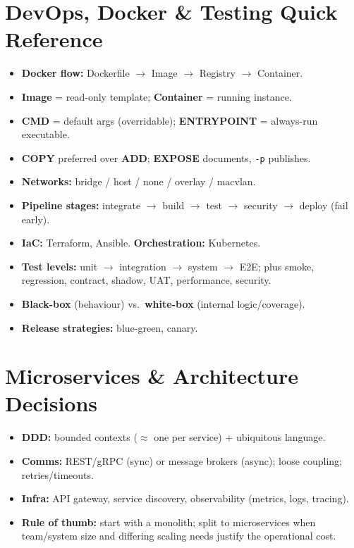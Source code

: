 \documentclass[hidelinks]{article}
\begin{document}
\section{DevOps, Docker \& Testing Quick Reference}
\begin{itemize}
  \item \textbf{Docker flow:} Dockerfile $\to$ Image $\to$ Registry $\to$ Container.
  \item \textbf{Image} = read-only template; \textbf{Container} = running instance.
  \item \textbf{CMD} = default args (overridable); \textbf{ENTRYPOINT} = always-run executable.
  \item \textbf{COPY} preferred over \textbf{ADD}; \textbf{EXPOSE} documents, \texttt{-p} publishes.
  \item \textbf{Networks:} bridge / host / none / overlay / macvlan.
  \item \textbf{Pipeline stages:} integrate $\to$ build $\to$ test $\to$ security $\to$ deploy
        (fail early).
  \item \textbf{IaC:} Terraform, Ansible. \textbf{Orchestration:} Kubernetes.
  \item \textbf{Test levels:} unit $\to$ integration $\to$ system $\to$ E2E; plus smoke, regression,
        contract, shadow, UAT, performance, security.
  \item \textbf{Black-box} (behaviour) vs.\ \textbf{white-box} (internal logic/coverage).
  \item \textbf{Release strategies:} blue-green, canary.
\end{itemize}

\section{Microservices \& Architecture Decisions}
\begin{itemize}
  \item \textbf{DDD:} bounded contexts ($\approx$ one per service) + ubiquitous language.
  \item \textbf{Comms:} REST/gRPC (sync) or message brokers (async); loose coupling;
        retries/timeouts.
  \item \textbf{Infra:} API gateway, service discovery, observability (metrics, logs, tracing).
  \item \textbf{Rule of thumb:} start with a monolith; split to microservices when team/system size
        and differing scaling needs justify the operational cost.
\end{itemize}
\end{document}
